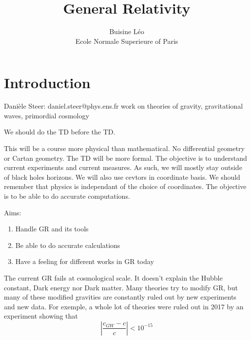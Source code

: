 \documentclass[a4paper]{book}
\theoremstyle{definition}
\theoremstyle{remark}
\begin{document}
\title{General Relativity}
\author{Buisine Léo\\Ecole Normale Superieure of Paris}
\maketitle

\tableofcontents

\chapter{Introduction}
Danièle Steer: daniel.steer@phys.ens.fr \newline
work on theories of gravity, gravitational waves, primordial cosmology \par \medskip 

We should do the TD before the TD. \par \medskip 

This will be a course more physical than mathematical. No differential geometry or Cartan geometry. The TD will be more formal. The objective is to understand current experiments and current measures. As such, we will mostly stay outside of black holes horizons. We will also use cevtors in coordinate basis. We should remember that physics is independant of the choice of coordinates. The objective is to be able to do accurate computations.\par \bigskip 

Aims:
\begin{enumerate}
    \item Handle GR and its tools
    \item Be able to do accurate calculations 
    \item Have a feeling for different works in GR today
\end{enumerate} \bigskip 

The current GR fails at cosmological scale. It doesn't explain the Hubble constant, Dark energy nor Dark matter. Many theories try to modify GR, but many of these modified gravities are constantly ruled out by new experiments and new data. For exemple, a whole lot of theories were ruled out in 2017 by an experiment showing that 
\begin{equation}
    \left|\frac{c_{GW}-c}{c}\right| < 10^{-15}
\end{equation}\par \medskip 
\end{document}
